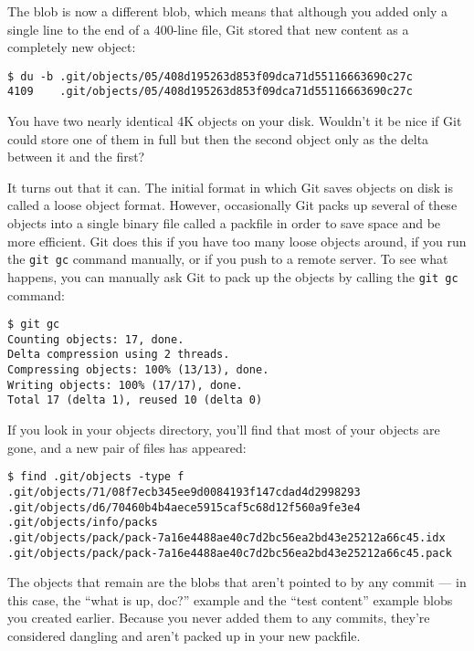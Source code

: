 \documentclass[a4paper]{book}
\begin{document}
The blob is now a different blob, which means that although you added only a single line to the end of a 400-line file, Git stored that new content as a completely new object:

\begin{shaded}\begin{verbatim}
$ du -b .git/objects/05/408d195263d853f09dca71d55116663690c27c
4109	.git/objects/05/408d195263d853f09dca71d55116663690c27c
\end{verbatim}\end{shaded}

You have two nearly identical 4K objects on your disk. Wouldn't it be nice if Git could store one of them in full but then the second object only as the delta between it and the first?

It turns out that it can. The initial format in which Git saves objects on disk is called a loose object format. However, occasionally Git packs up several of these objects into a single binary file called a packfile in order to save space and be more efficient. Git does this if you have too many loose objects around, if you run the \texttt{git gc} command manually, or if you push to a remote server. To see what happens, you can manually ask Git to pack up the objects by calling the \texttt{git gc} command:

\begin{shaded}\begin{verbatim}
$ git gc
Counting objects: 17, done.
Delta compression using 2 threads.
Compressing objects: 100% (13/13), done.
Writing objects: 100% (17/17), done.
Total 17 (delta 1), reused 10 (delta 0)
\end{verbatim}\end{shaded}

If you look in your objects directory, you'll find that most of your objects are gone, and a new pair of files has appeared:

\begin{shaded}\begin{verbatim}
$ find .git/objects -type f
.git/objects/71/08f7ecb345ee9d0084193f147cdad4d2998293
.git/objects/d6/70460b4b4aece5915caf5c68d12f560a9fe3e4
.git/objects/info/packs
.git/objects/pack/pack-7a16e4488ae40c7d2bc56ea2bd43e25212a66c45.idx
.git/objects/pack/pack-7a16e4488ae40c7d2bc56ea2bd43e25212a66c45.pack
\end{verbatim}\end{shaded}

The objects that remain are the blobs that aren't pointed to by any commit --- in this case, the “what is up, doc?” example and the “test content” example blobs you created earlier. Because you never added them to any commits, they're considered dangling and aren't packed up in your new packfile.
\end{document}
